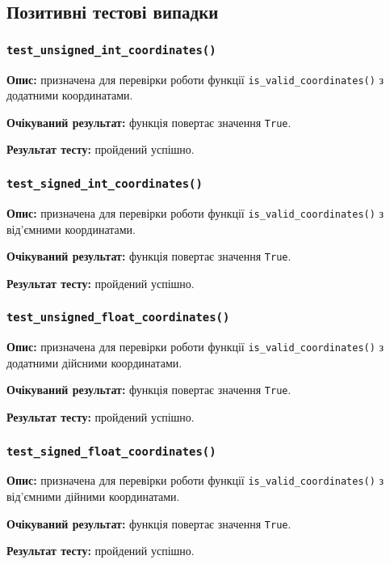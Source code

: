 \documentclass[a4paper,oneside,DIV=12,12pt]{scrartcl}
\newcommand{\funcname}[1]{\texttt{#1}}
\newcommand{\caseattrib}[1]{\noindent\textbf{#1}}
\newcommand{\printtrue}{\texttt{True}}
\begin{document}
		\subsection{Позитивні тестові випадки}
			\subsubsection{\funcname{test\_unsigned\_int\_coordinates()}}
				\caseattrib{Опис:} призначена для перевірки роботи функції \verb|is_valid_coordinates()| з додатними координатами.
				
				\caseattrib{Очікуваний результат:} функція повертає значення \printtrue.
				
				\caseattrib{Результат тесту:} пройдений успішно.
				
			\subsubsection{\funcname{test\_signed\_int\_coordinates()}}
				\caseattrib{Опис:} призначена для перевірки роботи функції \verb|is_valid_coordinates()| з від'ємними координатами.
				
				\caseattrib{Очікуваний результат:} функція повертає значення \printtrue.
				
				\caseattrib{Результат тесту:} пройдений успішно.
				
			\subsubsection{\funcname{test\_unsigned\_float\_coordinates()}}
				\caseattrib{Опис:} призначена для перевірки роботи функції \verb|is_valid_coordinates()| з додатними дійсними координатами.
				
				\caseattrib{Очікуваний результат:} функція повертає значення \printtrue.
				
				\caseattrib{Результат тесту:} пройдений успішно.
				
			\subsubsection{\funcname{test\_signed\_float\_coordinates()}}
				\caseattrib{Опис:} призначена для перевірки роботи функції \verb|is_valid_coordinates()| з від'ємними дійними координатами.
				
				\caseattrib{Очікуваний результат:} функція повертає значення \printtrue.
				
				\caseattrib{Результат тесту:} пройдений успішно.
		
\end{document}
